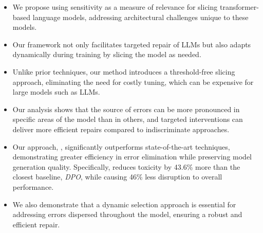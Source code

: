 \begin{itemize} 
\item We propose using sensitivity as a measure of relevance for slicing transformer-based language models, addressing architectural challenges unique to these models.

\item Our framework not only facilitates targeted repair of LLMs but also adapts dynamically during training by slicing the model as needed. 
\item Unlike prior techniques, our method introduces a threshold-free slicing approach, eliminating the need for costly tuning, which can be expensive for large models such as LLMs.

\item Our analysis shows that the source of errors can be more pronounced in specific areas of the model than in others, and targeted interventions can deliver more efficient repairs compared to indiscriminate approaches.
\item Our approach, \nick, significantly outperforms state-of-the-art techniques, demonstrating greater efficiency in error elimination while preserving model generation quality. Specifically, \nick reduces toxicity by 43.6\% more than the closest baseline, \textit{DPO}, while causing 46\% less disruption to overall performance.

\item We also demonstrate that a dynamic selection approach is essential for addressing errors dispersed throughout the model, ensuring a robust and efficient repair.
\end{itemize}


